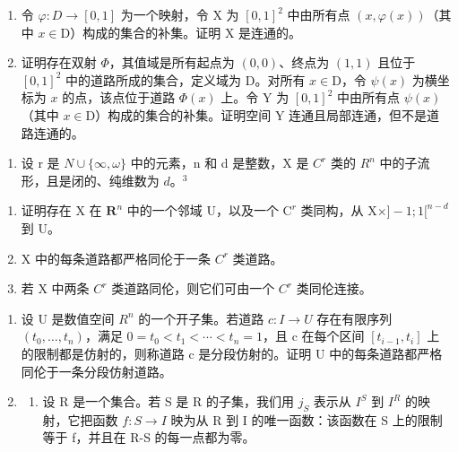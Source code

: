 \begin{enumerate}
\def\labelenumi{\alph{enumi})}
\item
 令 \(\varphi\colon D \to [0,1]\) 为一个映射，令 X 为 \([0,1]^2\) 中由所有点 \((x,\varphi(x))\)（其中 \(x\in\mathrm{D}\)）构成的集合的补集。证明 X 是连通的。
\item
  证明存在双射 \(\Phi\)，其值域是所有起点为 \((0,0)\)、终点为 \((1,1)\) 且位于 \([0,1]^2\) 中的道路所成的集合，定义域为 D。对所有 \(x \in \mathrm{D}\)，令 \(\psi(x)\) 为横坐标为 \(x\) 的点，该点位于道路 \(\Phi(x)\) 上。令 Y 为 \([0,1]^2\) 中由所有点 \(\psi(x)\)（其中 \(x \in \mathrm{D}\)）构成的集合的补集。证明空间 Y 连通且局部连通，但不是道路连通的。
\end{enumerate}

\begin{enumerate}
\def\labelenumi{\arabic{enumi})}
\setcounter{enumi}{4}
\tightlist
\item
  设 r 是 \(N \cup \{\infty, \omega\}\) 中的元素，n 和 d 是整数，X 是 \(C^{r}\) 类的 \(R^{n}\) 中的子流形，且是闭的、纯维数为 \(d\)。\(^{3}\)
\end{enumerate}

\begin{enumerate}
\def\labelenumi{\alph{enumi})}
\item
  证明存在 X 在 \(\mathbf{R}^n\) 中的一个邻域 U，以及一个 \(\mathrm{C}^r\) 类同构，从 \(\mathrm{X} \times ] - 1; 1[^{n - d}\) 到 \(\mathrm{U}\)。
\item
  X 中的每条道路都严格同伦于一条 \(C^{r}\) 类道路。
\item
  若 X 中两条 \(C^{r}\) 类道路同伦，则它们可由一个 \(C^{r}\) 类同伦连接。
\end{enumerate}

\begin{enumerate}
\def\labelenumi{\arabic{enumi})}
\setcounter{enumi}{5}
\item
  设 U 是数值空间 \(R^{n}\) 的一个开子集。若道路 \(c: I \to U\) 存在有限序列 \((t_{0}, \ldots, t_{n})\)，满足 \(0 = t_{0} < t_{1} < \cdots < t_{n} = 1\)，且 c 在每个区间 \([t_{i-1}, t_{i}]\) 上的限制都是仿射的，则称道路 c 是分段仿射的。证明 U 中的每条道路都严格同伦于一条分段仿射道路。
\item
  \begin{enumerate}
  \def\labelenumii{\alph{enumii})}
  \tightlist
  \item
    设 R 是一个集合。若 S 是 R 的子集，我们用 \(j_{S}\) 表示从 \(I^{S}\) 到 \(I^{R}\) 的映射，它把函数 \(f: S \to I\) 映为从 R 到 I 的唯一函数：该函数在 S 上的限制等于 f，并且在 R-S 的每一点都为零。
  \end{enumerate}
\end{enumerate}

